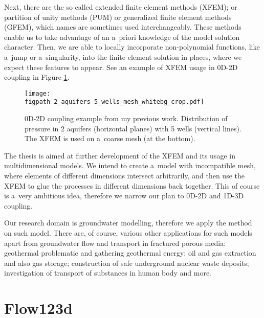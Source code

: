 \documentclass[bibliography=totocnumbered,dvipsnames,FM,Dis]{tulthesis_autoreferat}
\newcommand{\fig}[1]{Figure \hyperref[#1]{\ref{#1}}}
\newcommand{\figpath}{figures/}
\begin{document}
Next, there are the so called extended finite element methods (XFEM); or partition of unity methods (PUM) or generalized
finite element methods (GFEM), which names are sometimes used interchangeably. 
These methods enable us to take advantage of an a~priori knowledge of the model solution character.
Then, we are able to locally incorporate non-polynomial functions, like a~jump or a~singularity, into the finite element solution
 in places, where we expect these features to appear. See an example of XFEM usage in 0D-2D coupling in \fig{fig:aquifers}.
\begin{figure}[!htb]
  \centering    
    \texttt{[image: \\figpath 2\_aquifers-5\_wells\_mesh\_whitebg\_crop.pdf]}
  \caption{0D-2D coupling example from my previous work. Distribution of pressure in 2 aquifers (horizontal planes) with 5 wells 
          (vertical lines). The XFEM is used on a~coarse mesh (at the bottom). }
  \label{fig:aquifers}
\end{figure}

The thesis is aimed at further development of the XFEM and its usage in multidimensional models. 
We intend to create a~model with incompatible mesh, where elements of different dimensions intersect
arbitrarily, and then use the XFEM to glue the processes in different dimensions back together. 
This of course is a~very ambitious idea, therefore we narrow our plan to 0D-2D and 1D-3D coupling. 

Our research domain is groundwater modelling, therefore we apply the method on such model.
There are, of course, various other applications for such models apart from groundwater flow and transport in fractured porous media:
geothermal problematic and gathering geothermal energy; oil and gas extraction and also gas storage;
construction of safe underground nuclear waste deposits; investigation of transport of substances in human body
and more.

\section{Flow123d} \label{sec:soa_flow123d}
\end{document}
